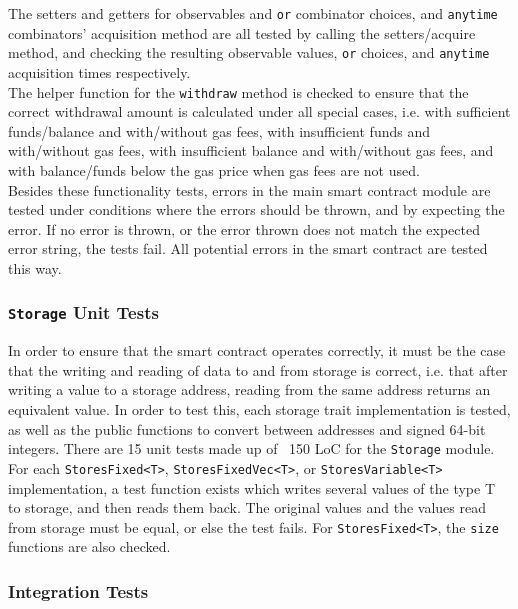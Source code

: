 The setters and getters for observables and \texttt{or} combinator choices, and \texttt{anytime} combinators' acquisition method are all tested by calling the setters/acquire method, and checking the resulting observable values, \texttt{or} choices, and \texttt{anytime} acquisition times respectively. \\

The helper function for the \texttt{withdraw} method is checked to ensure that the correct withdrawal amount is calculated under all special cases, i.e. with sufficient funds/balance and with/without gas fees, with insufficient funds and with/without gas fees, with insufficient balance and with/without gas fees, and with balance/funds below the gas price when gas fees are not used. \\

Besides these functionality tests, errors in the main smart contract module are tested under conditions where the errors should be thrown, and by expecting the error. If no error is thrown, or the error thrown does not match the expected error string, the tests fail. All potential errors in the smart contract are tested this way.


\subsubsection{\texttt{Storage} Unit Tests}

In order to ensure that the smart contract operates correctly, it must be the case that the writing and reading of data to and from storage is correct, i.e. that after writing a value to a storage address, reading from the same address returns an equivalent value. In order to test this, each storage trait implementation is tested, as well as the public functions to convert between addresses and signed 64-bit integers. There are 15 unit tests made up of ~150 LoC for the \texttt{Storage} module. \\

For each \texttt{StoresFixed<T>}, \texttt{StoresFixedVec<T>}, or \texttt{StoresVariable<T>} implementation, a test function exists which writes several values of the type T to storage, and then reads them back. The original values and the values read from storage must be equal, or else the test fails. For \texttt{StoresFixed<T>}, the \texttt{size} functions are also checked.


\subsubsection{Integration Tests}

